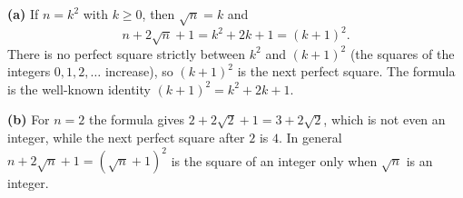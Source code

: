 \textbf{(a)} If $n=k^2$ with $k\ge0$, then $\sqrt n=k$ and
\[
n+2\sqrt n+1=k^2+2k+1=(k+1)^2 .
\]
There is no perfect square strictly between $k^2$ and $(k+1)^2$ (the squares of the integers $0,1,2,\dots$ increase), so $(k+1)^2$ is the next perfect square. The formula is the well-known identity $(k+1)^2=k^2+2k+1$.

\textbf{(b)} For $n=2$ the formula gives $2+2\sqrt2+1=3+2\sqrt2$, which is not even an integer, while the next perfect square after $2$ is $4$. In general $n+2\sqrt n+1=\left(\sqrt n+1\right)^2$ is the square of an integer only when $\sqrt n$ is an integer.
